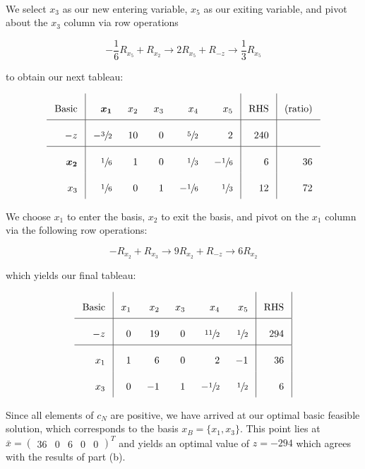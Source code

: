 \begin{solution}
  \ \\
  We select $x_3$ as our new entering variable, $x_5$ as our exiting variable, and pivot about the $x_3$ column via 
  row operations

  $$
  -\frac{1}{6} R_{x_5} + R_{x_2}  \longrightarrow 2 R_{x_5} + R_{-z} \longrightarrow \frac{1}{3} R_{x_5}
  $$

  to obtain our next tableau:

  \[\arraycolsep=8pt\def\arraystretch{2.2}
  \begin{array}{r|rrrrr|r|r}
     \text{Basic} &  \bm{x_1}      &  x_2 &  x_3  &  x_4           &  x_5          &  \text{RHS} &  \text{(ratio)} \\ \hline
    -z            & -\sfrac{3}{2}  &  10  &  0    &  \sfrac{5}{2}  &  2            &  240        &                 \\ \hline
     \bm{x_2}     &  \sfrac{1}{6}  &  1   &  0    &  \sfrac{1}{3}  & -\sfrac{1}{6} &  6          &  36             \\
     x_3          &  \sfrac{1}{6}  &  0   &  1    & -\sfrac{1}{6}  &  \sfrac{1}{3} &  12         &  72                           
  \end{array}
  \]

  We choose $x_1$ to enter the basis, $x_2$ to exit the basis, and pivot on the $x_1$ column via the following row 
  operations:

  $$
  -R_{x_2} + R_{x_3}  \longrightarrow 9 R_{x_2} + R_{-z} \longrightarrow 6 R_{x_2}
  $$


  which yields our final tableau:

  \[\arraycolsep=8pt\def\arraystretch{2.2}
  \begin{array}{r|rrrrr|r|r}
    \text{Basic} &  x_1  &  x_2 &  x_3  &  x_4           &  x_5           &  \text{RHS} \\ \hline
    -z           &  0    &  19  &  0    &  \sfrac{11}{2} &  \sfrac{1}{2}  &  294        \\ \hline
    x_1          &  1    &  6   &  0    &  2             & -1             &  36         \\
    x_3          &  0    & -1   &  1    & -\sfrac{1}{2}  &  \sfrac{1}{2}  &  6                            
  \end{array}
  \]

  Since all elements of $c_N$ are positive, we have arrived at our optimal basic feasible solution, which corresponds to
  the basis $x_B = \{x_1, x_3\}$. This point lies at \linebreak
  $\bar{x} = \begin{pmatrix} 36 &  0  &  6  &  0  &  0 \end{pmatrix}^T$ and yields an optimal value of $z = -294$ which
  agrees with the results of part (b).
  \ \\
\end{solution}